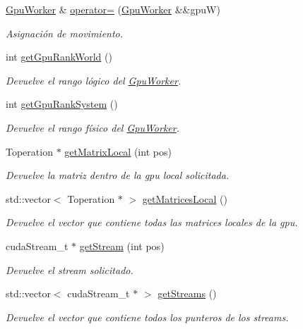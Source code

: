 \begin{DoxyCompactItemize}
\hyperlink{classGpuWorker}{Gpu\+Worker} \& \hyperlink{classGpuWorker_a34d676399244bd965f80f7fc45087bb0}{operator=} (\hyperlink{classGpuWorker}{Gpu\+Worker} \&\&gpuW)
\begin{DoxyCompactList}\small\item\em Asignación de movimiento. \end{DoxyCompactList}\item 
int \hyperlink{classGpuWorker_a383304583c095b121117d65084fbce9f}{get\+Gpu\+Rank\+World} ()
\begin{DoxyCompactList}\small\item\em Devuelve el rango lógico del \hyperlink{classGpuWorker}{Gpu\+Worker}. \end{DoxyCompactList}\item 
int \hyperlink{classGpuWorker_a2c6a4c743d19b27fe79d63b595f8a491}{get\+Gpu\+Rank\+System} ()
\begin{DoxyCompactList}\small\item\em Devuelve el rango físico del \hyperlink{classGpuWorker}{Gpu\+Worker}. \end{DoxyCompactList}\item 
Toperation $\ast$ \hyperlink{classGpuWorker_ac2fab4183f12b93343a5bae16030ba9c}{get\+Matrix\+Local} (int pos)
\begin{DoxyCompactList}\small\item\em Devuelve la matriz dentro de la gpu local solicitada. \end{DoxyCompactList}\item 
std\+::vector$<$ Toperation $\ast$ $>$ \hyperlink{classGpuWorker_a318e06057a681b2431eee77ccd2da790}{get\+Matrices\+Local} ()
\begin{DoxyCompactList}\small\item\em Devuelve el vector que contiene todas las matrices locales de la gpu. \end{DoxyCompactList}\item 
cuda\+Stream\+\_\+t $\ast$ \hyperlink{classGpuWorker_ab2b50a39e23077b680641a541647ce3f}{get\+Stream} (int pos)
\begin{DoxyCompactList}\small\item\em Devuelve el stream solicitado. \end{DoxyCompactList}\item 
std\+::vector$<$ cuda\+Stream\+\_\+t $\ast$ $>$ \hyperlink{classGpuWorker_ada2a94dd947cf2c2b35611584e22c194}{get\+Streams} ()
\begin{DoxyCompactList}\small\item\em Devuelve el vector que contiene todos los punteros de los streams. \end{DoxyCompactList}\item 

\end{DoxyCompactItemize}
